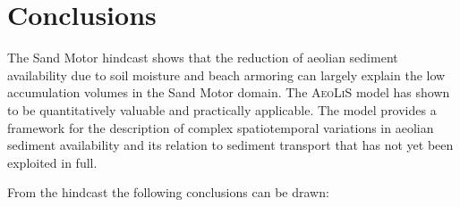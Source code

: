 %










\section{Conclusions}

The Sand Motor hindcast shows that the reduction of aeolian sediment
availability due to soil moisture and beach armoring can largely
explain the low accumulation volumes in the Sand Motor domain. The
\textsc{AeoLiS} model has shown to be quantitatively valuable and
practically applicable. The model provides a framework for the
description of complex spatiotemporal variations in aeolian sediment
availability and its relation to sediment transport that has not yet
been exploited in full.

\bigskip

\noindent From the hindcast the following conclusions can be drawn:

